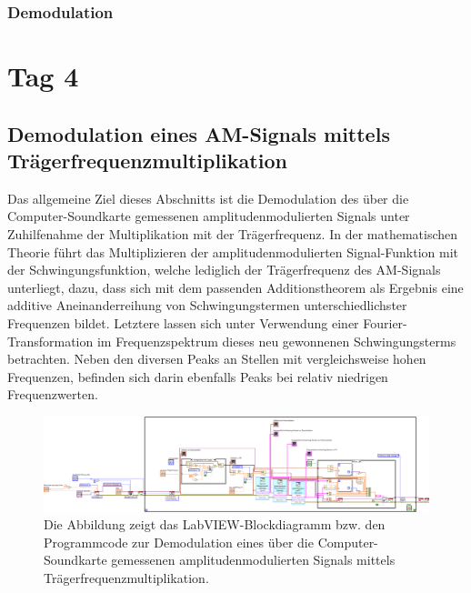 \documentclass[
a4paper,
12pt,
pagesize,
ngerman
]{scrartcl}
\begin{document}
	\subsubsection{Demodulation} \label{DemodulationAM}
	\section{Tag 4}
	
	\subsection{Demodulation eines AM-Signals mittels Trägerfrequenzmultiplikation}
		
	Das allgemeine Ziel dieses Abschnitts ist die Demodulation des über die Computer-Soundkarte gemessenen amplitudenmodulierten Signals unter Zuhilfenahme der Multiplikation mit der Trägerfrequenz. In der mathematischen Theorie führt das Multiplizieren der amplitudenmodulierten Signal-Funktion mit der Schwingungsfunktion, welche lediglich der Trägerfrequenz des AM-Signals unterliegt, dazu, dass sich mit dem passenden Additionstheorem als Ergebnis eine additive Aneinanderreihung von Schwingungstermen unterschiedlichster Frequenzen bildet. Letztere lassen sich unter Verwendung einer Fourier-Transformation im Frequenzspektrum dieses neu gewonnenen Schwingungsterms betrachten. Neben den diversen Peaks an Stellen mit vergleichsweise hohen Frequenzen, befinden sich darin ebenfalls Peaks bei relativ niedrigen Frequenzwerten.
		
	\begin{figure}[H]
		\centering
		\includegraphics[width=1.0\textwidth]{EIRE2018Dateien/Tag4/traegerMultOszi/Oszilloskop__modifiziertd}
		\caption{Die Abbildung zeigt das LabVIEW-Blockdiagramm bzw. den Programmcode zur Demodulation eines über die Computer-Soundkarte gemessenen amplitudenmodulierten Signals mittels Trägerfrequenzmultiplikation.}
		\label{MultiTraegerProgrammcode}
	\end{figure}
\end{document}
